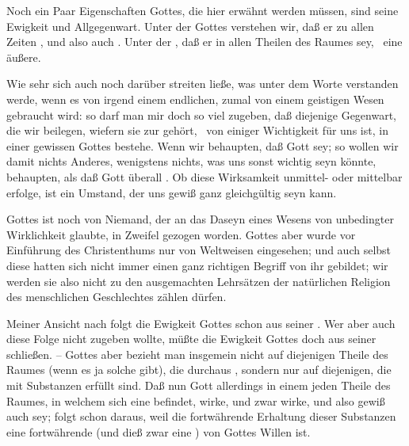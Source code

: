 \begin{aufza}
\item Noch ein Paar Eigenschaften Gottes, die hier erwähnt werden müssen, sind seine Ewigkeit und Allgegenwart. Unter der  Gottes verstehen wir, daß er zu allen Zeiten , und also auch . Unter der , daß er in allen Theilen des Raumes  sey, \dh\ eine  äußere.
\begin{RWanm}
Wie sehr sich auch noch darüber streiten ließe, was unter dem Worte  verstanden werde, wenn es von irgend einem endlichen, zumal von einem geistigen Wesen gebraucht wird: so darf man mir doch so viel zugeben, daß diejenige Gegenwart, die wir  beilegen, wiefern sie zur  gehört, \dh\ von einiger Wichtigkeit für uns ist, in einer gewissen  Gottes bestehe. Wenn wir behaupten, daß Gott  sey; so wollen wir damit nichts Anderes, wenigstens nichts, was uns sonst wichtig seyn könnte, behaupten, als daß Gott überall .  Ob diese Wirksamkeit unmittel- oder mittelbar erfolge, ist ein Umstand, der uns gewiß ganz gleichgültig seyn kann.
\end{RWanm}
\item Gottes  ist noch von Niemand, der an das Daseyn eines Wesens von unbedingter Wirklichkeit glaubte, in Zweifel gezogen worden. Gottes  aber wurde vor Einführung des Christenthums nur von Weltweisen eingesehen; und auch selbst diese hatten sich nicht immer einen ganz richtigen Begriff von ihr gebildet; wir werden sie also nicht zu den ausgemachten Lehrsätzen der natürlichen Religion des menschlichen Geschlechtes zählen dürfen.
\item Meiner Ansicht nach folgt die Ewigkeit Gottes schon aus seiner . Wer aber auch diese Folge nicht zugeben wollte, müßte die Ewigkeit Gottes doch aus seiner  schließen. -- Gottes  aber bezieht man insgemein nicht auf diejenigen Theile des Raumes (wenn es ja solche gibt), die durchaus , sondern nur auf diejenigen, die mit Substanzen erfüllt sind. Daß nun Gott allerdings in einem jeden Theile des Raumes, in welchem sich eine  befindet, wirke, und zwar  wirke, und also gewiß auch  sey; folgt schon daraus, weil die fortwährende Erhaltung dieser Substanzen eine fortwährende  (und dieß zwar eine ) von Gottes Willen ist.
\end{aufza}

